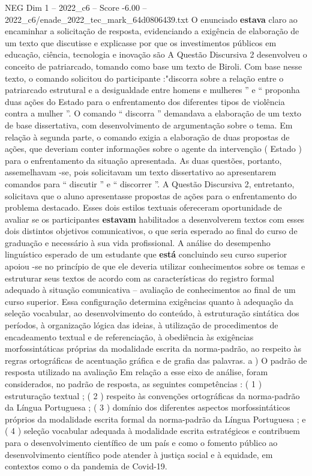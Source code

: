 \begin{textsample}{NEG Dim 1 – 2022\_c6 – Score -6.00 – 2022\_c6/enade\_2022\_tec\_mark\_64d0806439.txt}
O enunciado \textbf{estava} claro ao encaminhar a solicitação de resposta, evidenciando a exigência de elaboração de um texto que discutisse e explicasse por que os investimentos públicos em educação, ciência, tecnologia e inovação são A Questão Discursiva 2 desenvolveu o conceito de patriarcado, tomando como base um texto de Biroli.
Com base nesse texto, o comando solicitou do participante :"discorra sobre a relação entre o patriarcado estrutural e a desigualdade entre homens e mulheres ” e “ proponha duas ações do Estado para o enfrentamento dos diferentes tipos de violência contra a mulher ”.
O comando “ discorra ” demandava a elaboração de um texto de base dissertativa, com desenvolvimento de argumentação sobre o tema.
Em relação à segunda parte, o comando exigia a elaboração de duas propostas de ações, que deveriam conter informações sobre o agente da intervenção ( Estado ) para o enfrentamento da situação apresentada.
As duas questões, portanto, assemelhavam -se, pois solicitavam um texto dissertativo ao apresentarem comandos para “ discutir ” e “ discorrer ”.
A Questão Discursiva 2, entretanto, solicitava que o aluno apresentasse propostas de ações para o enfrentamento do problema destacado.
Esses dois estilos textuais ofereceram oportunidade de avaliar se os participantes \textbf{estavam} habilitados a desenvolverem textos com esses dois distintos objetivos comunicativos, o que seria esperado ao final do curso de graduação e necessário à sua vida profissional.
A análise do desempenho linguístico esperado de um estudante que \textbf{está} concluindo seu curso superior apoiou -se no princípio de que ele deveria utilizar conhecimentos sobre os temas e estruturar seus textos de acordo com as características do registro formal adequado à situação comunicativa – avaliação de conhecimentos ao final de um curso superior.
Essa configuração determina exigências quanto à adequação da seleção vocabular, ao desenvolvimento do conteúdo, à estruturação sintática dos períodos, à organização lógica das ideias, à utilização de procedimentos de encadeamento textual e de referenciação, à obediência às exigências morfossintáticas próprias da modalidade escrita da norma-padrão, ao respeito às regras ortográficas de acentuação gráfica e de grafia das palavras. a ) O padrão de resposta utilizado na avaliação Em relação a esse eixo de análise, foram considerados, no padrão de resposta, as seguintes competências : ( 1 ) estruturação textual ; ( 2 ) respeito às convenções ortográficas da norma-padrão da Língua Portuguesa ; ( 3 ) domínio dos diferentes aspectos morfossintáticos próprios da modalidade escrita formal da norma-padrão da Língua Portuguesa ; e ( 4 ) seleção vocabular adequada à modalidade escrita estratégicos e contribuem para o desenvolvimento científico de um país e como o fomento público ao desenvolvimento científico pode atender à justiça social e à equidade, em contextos como o da pandemia de Covid-19.

\end{textsample}
